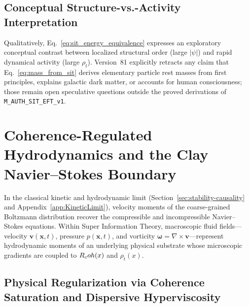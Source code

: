 \subsection{Conceptual Structure-vs.-Activity Interpretation}

Qualitatively, Eq.~\eqref{eq:sit_energy_equivalence} expresses an exploratory conceptual contrast between localized structural order (large $|\psi|$) and rapid dynamical activity (large $\rho_t$). Version~81 explicitly retracts any claim that Eq.~\eqref{eq:mass_from_sit} derives elementary particle rest masses from first principles, explains galactic dark matter, or accounts for human consciousness; those remain open speculative questions outside the proved derivations of \texttt{M\_AUTH\_SIT\_EFT\_v1}.



\section{Coherence-Regulated Hydrodynamics and the Clay Navier--Stokes Boundary}
\label{sec:navier-stokes-boundary}

In the classical kinetic and hydrodynamic limit (Section~\ref{sec:stability-causality} and Appendix~\ref{app:KineticLimit}), velocity moments of the coarse-grained Boltzmann distribution recover the compressible and incompressible Navier--Stokes equations. Within Super Information Theory, macroscopic fluid fields---velocity $\mathbf{v}(\mathbf{x},t)$, pressure $p(\mathbf{x},t)$, and vorticity $\boldsymbol{\omega} = \nabla \times \mathbf{v}$---represent hydrodynamic moments of an underlying physical substrate whose microscopic gradients are coupled to $R_coh(x)$ and $\rho_t(x)$.

\subsection{Physical Regularization via Coherence Saturation and Dispersive Hyperviscosity}

